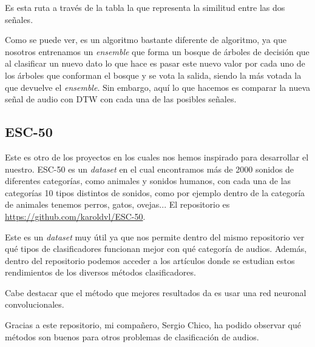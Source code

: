 Es esta ruta a través de la tabla la que representa la similitud entre las dos señales.

Como se puede ver, es un algoritmo bastante diferente de algoritmo, ya que nosotros entrenamos un \textit{ensemble} que forma un bosque de árboles de decisión que al clasificar un nuevo dato lo que hace es pasar este nuevo valor por cada uno de los árboles que conforman el bosque y se vota la salida, siendo la más votada la que devuelve el \textit{ensemble}. Sin embargo, aquí lo que hacemos es comparar la nueva señal de audio con DTW con cada una de las posibles señales.

\subsection{ESC-50}
Este es otro de los proyectos en los cuales nos hemos inspirado para desarrollar el nuestro. ESC-50 es un \textit{dataset} en el cual encontramos más de 2000 sonidos de diferentes categorías, como animales y sonidos humanos, con cada una de las categorías 10 tipos distintos de sonidos, como por ejemplo dentro de la categoría de animales tenemos perros, gatos, ovejas... El repositorio es \url{https://github.com/karoldvl/ESC-50}.

Este es un \textit{dataset}  muy útil ya que nos permite dentro del mismo repositorio ver qué tipos de clasificadores funcionan mejor con qué categoría de audios. Además, dentro del repositorio podemos acceder a los artículos donde se estudian estos rendimientos de los diversos métodos clasificadores.

Cabe destacar que el método que mejores resultados da es usar una red neuronal convolucionales.

Gracias a este repositorio, mi compañero, Sergio Chico, ha podido observar qué métodos son buenos para otros problemas de clasificación de audios.
